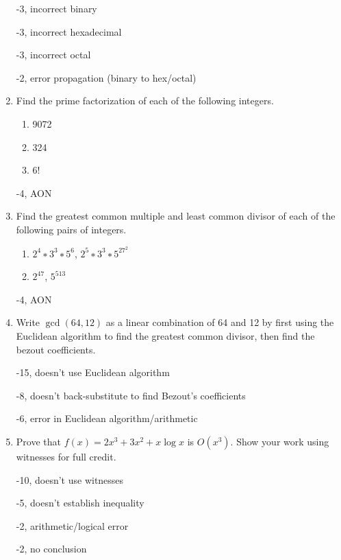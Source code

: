 \begin{enumerate}
\begin{rubric}
-3, incorrect binary

-3, incorrect hexadecimal

-3, incorrect octal

-2, error propagation (binary to hex/octal)
\end{rubric}

\item Find the prime factorization of each of the following integers. 
\begin{enumerate}
    \item 9072
    \item 324
    \item 6!
\end{enumerate}

\begin{rubric}
    -4, AON
\end{rubric}

\item Find the greatest common multiple and least common divisor of each of the following pairs of integers. 
\begin{enumerate}
    \item $2^4 ∗ 3^3 ∗ 5^6$, $2^5 ∗ 3^3 ∗ 5^27^2$
    \item $2^47$, $5^513$
\end{enumerate}

\begin{rubric}
    -4, AON
\end{rubric}

\item Write $\gcd(64,12)$ as a linear combination of 64 and 12 by first using the Euclidean algorithm to find the greatest common divisor, then find the bezout coefficients. 


\begin{rubric}
    -15, doesn't use Euclidean algorithm
    
    -8, doesn't back-substitute to find Bezout's coefficients
    
    -6, error in Euclidean algorithm/arithmetic
    
    
\end{rubric}

\item Prove that $f(x) = 2x^3 + 3x^2 + x\log{x}$ is $O(x^3)$. Show your work using witnesses for full credit. 
\begin{rubric}
-10, doesn't use witnesses

-5, doesn't establish inequality

-2, arithmetic/logical error

-2, no conclusion
\end{rubric}

\end{enumerate}